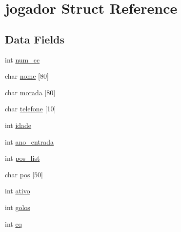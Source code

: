 \hypertarget{structjogador}{\section{jogador \-Struct \-Reference}
\label{structjogador}
}
\subsection*{\-Data \-Fields}
\begin{DoxyCompactItemize}
\item 
int \hyperlink{structjogador_a561e04bb7721ed7305217ca1d72f1ed8}{num\-\_\-cc}
\item 
char \hyperlink{structjogador_a2fe8d29936547b4ede632f419ea32367}{nome} \mbox{[}80\mbox{]}
\item 
char \hyperlink{structjogador_a3df114e4e75498c37caefddacb73b269}{morada} \mbox{[}80\mbox{]}
\item 
char \hyperlink{structjogador_a2b3e6e14a2f6909a2d7c095c16a343c8}{telefone} \mbox{[}10\mbox{]}
\item 
int \hyperlink{structjogador_ad5ea2e19b7deb827930edce70e13e3b8}{idade}
\item 
int \hyperlink{structjogador_a2e49c9f291640b9a3c7cbb2a6b991a00}{ano\-\_\-entrada}
\item 
int \hyperlink{structjogador_a4cf0debbda53bf46c4417eecce803e04}{pos\-\_\-list}
\item 
char \hyperlink{structjogador_a7e6f061ca28cd2d7f3080f7944feebcd}{pos} \mbox{[}50\mbox{]}
\item 
int \hyperlink{structjogador_a5bc3bc4334890083c1af35103dae7964}{ativo}
\item 
int \hyperlink{structjogador_a75eadc222dfc01c3e9c17f4ee4d081b6}{golos}
\item 
int \hyperlink{structjogador_a4003fea83807abede669219efed9948b}{eq}
\end{DoxyCompactItemize}


